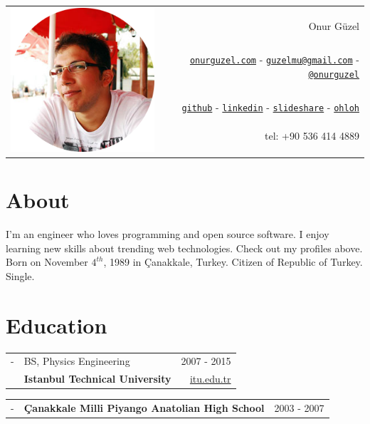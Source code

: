 \documentclass[11pt,a4paper]{article}
\author{\name}
\title{\cv}
\def\name{Onur Güzel}
\renewenvironment{itemize}{
  \begin{list}{}{
    \setlength{\leftmargin}{0em}
  }
}{
  \end{list}
}
\begin{document}

\begin{tabularx}{\textwidth}{ X r }
\multirow{6}{*}{\includegraphics[scale=0.4]{photo}} & \\[0.5cm]
 & \Huge \name\\
 & \href{http://www.onurguzel.com/}{\tt onurguzel.com} - 
\href{mailto:guzelmu@gmail.com}{\tt guzelmu@gmail.com} - 
\href{http://onurguzel.com/twitter}{\tt @onurguzel}\\
 & \href{http://onurguzel.com/github}{\tt github} - 
\href{http://linkedin.com/in/guzelmu}{\tt linkedin} - 
\href{http://www.slideshare.net/onurguzel}{\tt slideshare} - 
\href{http://www.ohloh.net/accounts/onurguzel}{\tt ohloh}\\
 & tel: +90 536 414 4889\\
 & \\[0.5cm]
\end{tabularx}

\section*{About}
I'm an engineer who loves programming and open source software. I enjoy learning new skills about trending web technologies. Check out my profiles above.\\[10pt]
Born on November $4^{th}$, 1989 in Çanakkale, Turkey. Citizen of Republic of Turkey. Single.

\section*{Education}
\begin{itemize}
\item
\begin{tabularx}{\textwidth}{ l X r }
- & BS, Physics Engineering & 2007 - 2015 \\
& \textbf{Istanbul Technical University} & \href{http://www.itu.edu.tr/en/}{itu.edu.tr}
\end{tabularx}
\item
\begin{tabularx}{\textwidth}{l X r}
- & \textbf{Çanakkale Milli Piyango Anatolian High School} & 2003 - 2007
\end{tabularx}
\end{itemize}
\end{document}
